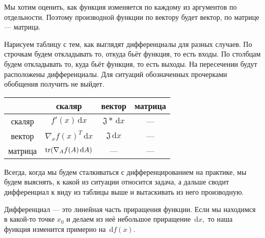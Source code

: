 \documentclass[12pt,fleqn]{article}
\newcommand{\dx}[1]{\,\mathrm{d}#1} %
\begin{document}
Мы хотим оценить, как функция изменяется по каждому из аргументов по отдельности. Поэтому производной функции по вектору будет вектор, по матрице --- матрица.

Нарисуем таблицу с тем, как выглядят дифференциалы для разных случаев. По строчкам будем откладывать то, откуда бьёт функция, то есть входы. По столбцам будем откладывать то, куда бьёт функция, то есть выходы. На пересечении будут расположены дифференциалы. Для ситуаций обозначенных прочерками обобщения получить не выйдет. 

\begin{center} 
    \begin{tabular}{|c|c|c|c|}
    \hline
        & скаляр & вектор & матрица \\
    \hline 
    скаляр & $f'(x) \dx{x}$  &  $\mathfrak{J} * \dx{x}$  & ---          \\
    \hline
    вектор & $ \nabla_x f(x)^T \dx{x}$    &   $\mathfrak{J} \dx{x}$     &  ---        \\
    \hline
    матрица & $\Tr( \nabla_A f(A) \dx{A})$    &    ---    & ---        \\
    \hline
    \end{tabular}
\end{center} 

Всегда, когда мы будем сталкиваться с дифференцированием на практике, мы будем выяснять, к какой из ситуации относится задача, а дальше сводит дифференциал к виду из таблицы выше и вытаскивать из него производную. 

Дифференциал --- это линейная часть приращения функции. Если мы находимся в какой-то точке $x_0$ и делаем из неё небольшое приращение $\dx{x},$ то наша функция изменится примерно на $\dx{f(x)}$. 
\end{document}
